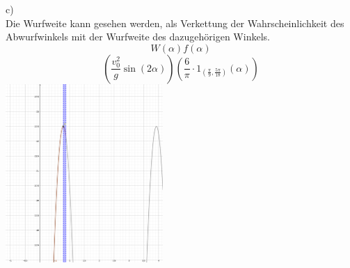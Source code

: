 \documentclass{article}
\begin{document}
	c)\\
	Die Wurfweite kann gesehen werden, als Verkettung der Wahrscheinlichkeit des Abwurfwinkels mit der Wurfweite des dazugehörigen Winkels.
	\[W(\alpha)f(\alpha)\]
	\[(\frac{v_0^2}{g}\sin(2\alpha))(\frac{6}{\pi}\cdot 1_{(\frac{\pi}{9},\frac{5\pi}{18})}(\alpha))\]
	\includegraphics[height=256px]{gezeigtNichtNullIntervall.png}
\end{document}
